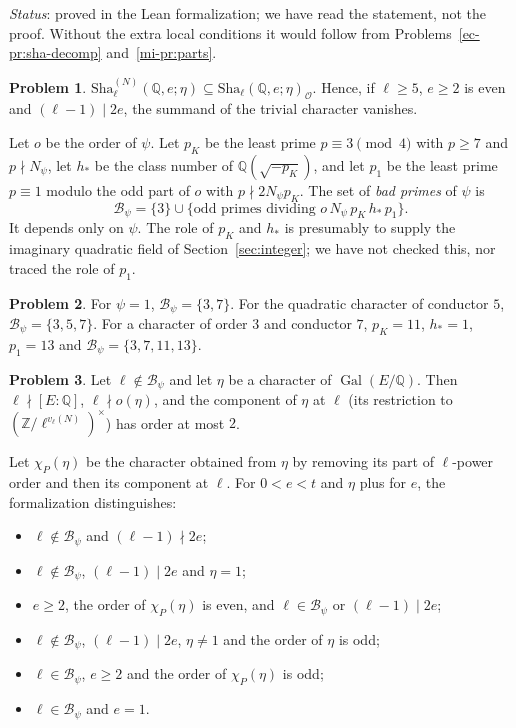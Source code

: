 \documentclass[reqno]{amsart}
\theoremstyle{definition}
\newtheorem{problem}{Problem}[section]
\theoremstyle{plain}
\theoremstyle{remark}
\newcommand{\Z}{\mathbb{Z}}
\newcommand{\Q}{\mathbb{Q}}
\newcommand{\Oc}{\mathcal{O}}
\newcommand{\Bc}{\mathcal{B}}
\newcommand{\Gal}{\operatorname{Gal}}
\newcommand{\Sha}{\mathrm{Sha}}
\begin{document}
\noindent\emph{Status}: proved in the Lean formalization; we have read the statement, not the proof.  Without the extra local conditions it would follow from Problems~\ref{ec-pr:sha-decomp} and~\ref{mi-pr:parts}.

\begin{problem}\label{pr:caseZ}
\(\Sha^{(N)}_\ell(\Q,e;\eta)\subseteq\Sha_\ell(\Q,e;\eta)_\Oc\).  Hence, if \(\ell\ge5\), \(e\ge2\) is even and \((\ell-1)\mid2e\), the summand of the trivial character vanishes.
\end{problem}

Let \(o\) be the order of \(\psi\).  Let \(p_K\) be the least prime \(p\equiv3\pmod4\) with \(p\ge7\) and \(p\nmid N_\psi\), let \(h_*\) be the class number of \(\Q(\sqrt{-p_K})\), and let \(p_1\) be the least prime \(p\equiv1\) modulo the odd part of \(o\) with \(p\nmid2N_\psi p_K\).  The set of \emph{bad primes} of \(\psi\) is
\[
 \Bc_\psi=\{3\}\cup\{\text{odd primes dividing }o\,N_\psi\,p_K\,h_*\,p_1\}.
\]
It depends only on \(\psi\).  The role of \(p_K\) and \(h_*\) is presumably to supply the imaginary quadratic field of Section~\ref{sec:integer}; we have not checked this, nor traced the role of \(p_1\).

\begin{problem}\label{pr:bad-primes}
For \(\psi=1\), \(\Bc_\psi=\{3,7\}\).  For the quadratic character of conductor \(5\), \(\Bc_\psi=\{3,5,7\}\).  For a character of order \(3\) and conductor \(7\), \(p_K=11\), \(h_*=1\), \(p_1=13\) and \(\Bc_\psi=\{3,7,11,13\}\).
\end{problem}

\begin{problem}\label{pr:gd-auto}
Let \(\ell\notin\Bc_\psi\) and let \(\eta\) be a character of \(\Gal(E/\Q)\).  Then \(\ell\nmid[E:\Q]\), \(\ell\nmid o(\eta)\), and the component of \(\eta\) at \(\ell\) (its restriction to \((\Z/\ell^{v_\ell(N)})^\times\)) has order at most \(2\).
\end{problem}

Let \(\chi_P(\eta)\) be the character obtained from \(\eta\) by removing its part of \(\ell\)-power order and then its component at \(\ell\).  For \(0<e<t\) and \(\eta\) plus for \(e\), the formalization distinguishes:
\begin{itemize}
\item[I] \(\ell\notin\Bc_\psi\) and \((\ell-1)\nmid2e\);
\item[Z] \(\ell\notin\Bc_\psi\), \((\ell-1)\mid2e\) and \(\eta=1\);
\item[II] \(e\ge2\), the order of \(\chi_P(\eta)\) is even, and \(\ell\in\Bc_\psi\) or \((\ell-1)\mid2e\);
\item[III] \(\ell\notin\Bc_\psi\), \((\ell-1)\mid2e\), \(\eta\ne1\) and the order of \(\eta\) is odd;
\item[IV] \(\ell\in\Bc_\psi\), \(e\ge2\) and the order of \(\chi_P(\eta)\) is odd;
\item[V] \(\ell\in\Bc_\psi\) and \(e=1\).
\end{itemize}
\end{document}
